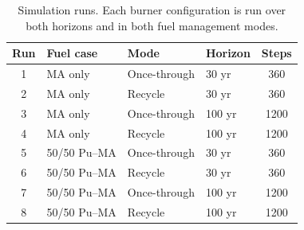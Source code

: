 \begin{table}[h!]
    \centering
    \caption{Simulation runs. Each burner configuration is run over both
    horizons and in both fuel management modes.}
    \label{tab:scenario-runs}
    \begin{tabular}{c l l l c}
        \hline
        \textbf{Run} & \textbf{Fuel case} & \textbf{Mode} &
        \textbf{Horizon} & \textbf{Steps} \\
        \hline
        1 & MA only      & Once-through & 30 yr  & 360  \\
        2 & MA only      & Recycle      & 30 yr  & 360  \\
        3 & MA only      & Once-through & 100 yr & 1200 \\
        4 & MA only      & Recycle      & 100 yr & 1200 \\
        5 & 50/50 Pu--MA & Once-through & 30 yr  & 360  \\
        6 & 50/50 Pu--MA & Recycle      & 30 yr  & 360  \\
        7 & 50/50 Pu--MA & Once-through & 100 yr & 1200 \\
        8 & 50/50 Pu--MA & Recycle      & 100 yr & 1200 \\
        \hline
    \end{tabular}
\end{table}